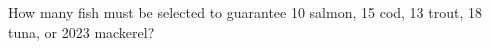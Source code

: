 How many fish must be selected to guarantee 10 salmon, 15 cod, 13 trout, 18 tuna, or 2023 mackerel?
